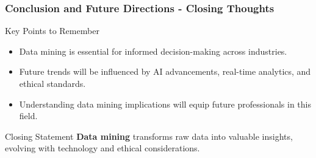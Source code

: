 \documentclass[aspectratio=169]{beamer}
\begin{document}
\begin{frame}[fragile]
    \frametitle{Conclusion and Future Directions - Closing Thoughts}
    
    \begin{block}{Key Points to Remember}
        \begin{itemize}
            \item Data mining is essential for informed decision-making across industries.
            \item Future trends will be influenced by AI advancements, real-time analytics, and ethical standards.
            \item Understanding data mining implications will equip future professionals in this field.
        \end{itemize}
    \end{block}
    
    \begin{block}{Closing Statement}
        \textbf{Data mining} transforms raw data into valuable insights, evolving with technology and ethical considerations.
    \end{block}
\end{frame}
\end{document}
